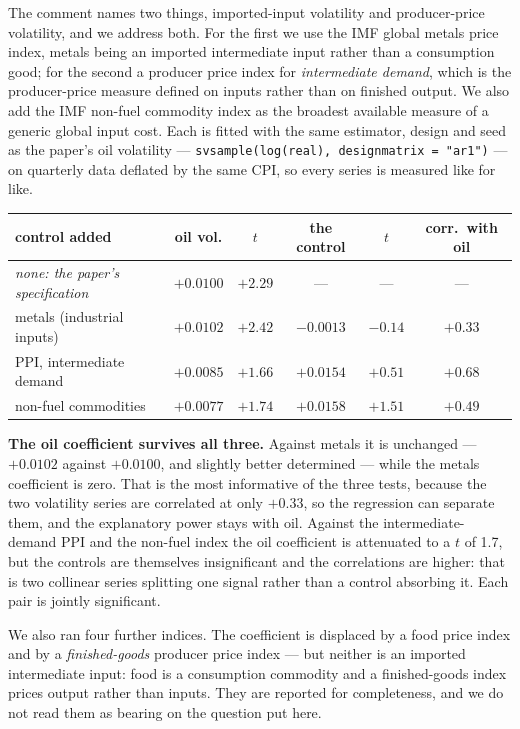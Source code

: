 The comment names two things, imported-input volatility and producer-price
volatility, and we address both. For the first we use the IMF global metals
price index, metals being an imported intermediate input rather than a
consumption good; for the second a producer price index for \emph{intermediate
demand}, which is the producer-price measure defined on inputs rather than on
finished output. We also add the IMF non-fuel commodity index as the broadest
available measure of a generic global input cost. Each is fitted with the same
estimator, design and seed as the paper's oil volatility ---
\texttt{svsample(log(real), designmatrix = "ar1")} --- on quarterly data
deflated by the same CPI, so every series is measured like for like.

\begin{table}[h]
\centering\footnotesize
\setlength{\tabcolsep}{5pt}
\begin{tabular}{lccccc}
\toprule
control added & oil vol. & $t$ & the control & $t$ & corr.\ with oil \\
\midrule
\emph{none: the paper's specification} & $+0.0100$ & $+2.29$ & --- & --- & --- \\
metals (industrial inputs)             & $+0.0102$ & $+2.42$ & $-0.0013$ & $-0.14$ & $+0.33$ \\
PPI, intermediate demand               & $+0.0085$ & $+1.66$ & $+0.0154$ & $+0.51$ & $+0.68$ \\
non-fuel commodities                   & $+0.0077$ & $+1.74$ & $+0.0158$ & $+1.51$ & $+0.49$ \\
\bottomrule
\end{tabular}
\end{table}

\textbf{The oil coefficient survives all three.} Against metals it is
unchanged --- $+0.0102$ against $+0.0100$, and slightly better determined ---
while the metals coefficient is zero. That is the most informative of the three
tests, because the two volatility series are correlated at only $+0.33$, so the
regression can separate them, and the explanatory power stays with oil. Against
the intermediate-demand PPI and the non-fuel index the oil coefficient is
attenuated to a $t$ of 1.7, but the controls are themselves insignificant and the
correlations are higher: that is two collinear series splitting one signal rather
than a control absorbing it. Each pair is jointly significant.

We also ran four further indices. The coefficient is displaced by a food price
index and by a \emph{finished-goods} producer price index --- but neither is an
imported intermediate input: food is a consumption commodity and a finished-goods
index prices output rather than inputs. They are reported for completeness, and
we do not read them as bearing on the question put here.

